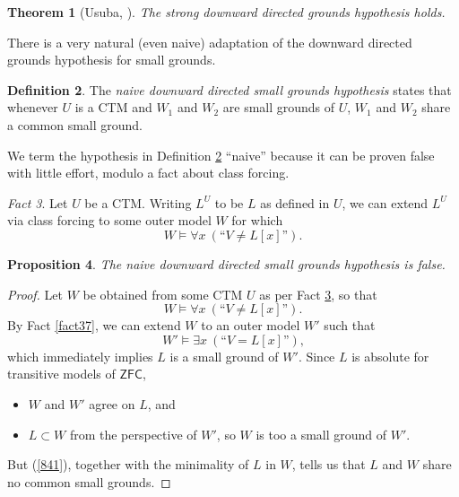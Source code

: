 \documentclass[12pt, twoside]{memoir}
\numberwithin{equation}{section}
\newtheorem{thm}{Theorem}[section]
\newtheorem{prop}[thm]{Proposition}
\theoremstyle{definition}
\newtheorem{defi}[thm]{Definition}
\theoremstyle{remark}
\newtheorem{fact}[thm]{Fact}
\theoremstyle{definition}
\theoremstyle{definition}
\theoremstyle{definition}
\theoremstyle{remark}
\begin{document}
\begin{thm}[Usuba, \cite{usuba}]
The strong downward directed grounds hypothesis holds.
\end{thm}

There is a very natural (even naive) adaptation of the downward directed grounds hypothesis for small grounds.

\begin{defi}\label{naiveddg}
The \emph{naive downward directed small grounds hypothesis} states that whenever $U$ is a CTM and $W_1$ and $W_2$ are small grounds of $U$, $W_1$ and $W_2$ share a common small ground.
\end{defi}

We term the hypothesis in Definition \ref{naiveddg} ``naive'' because it can be proven false with little effort, modulo a fact about class forcing.

\begin{fact}\label{naiveddgf}
Let $U$ be a CTM. Writing $L^U$ to be $L$ as defined in $U$, we can extend $L^U$ via class forcing to some outer model $W$ for which $$W \models \forall x \ (\text{``} V \neq L[x] \text{''}) \text{.}$$
\end{fact}

\begin{prop}\label{nddgfalse}
The naive downward directed small grounds hypothesis is false.
\end{prop}

\begin{proof}
Let $W$ be obtained from some CTM $U$ as per Fact \ref{naiveddgf}, so that 
\begin{equation}\label{841}
    W \models \forall x \ (\text{``} V \neq L[x] \text{''}) \text{.}
\end{equation} 
By Fact \ref{fact37}, we can extend $W$ to an outer model $W'$ such that $$W' \models \exists x \ (\text{``} V = L[x] \text{''}) \text{,}$$ which immediately implies $L$ is a small ground of $W'$. Since $L$ is absolute for transitive models of $\mathsf{ZFC}$, 
\begin{itemize}
    \item $W$ and $W'$ agree on $L$, and
    \item $L \subset W$ from the perspective of $W'$, so $W$ is too a small ground of $W'$.
\end{itemize} 
But (\ref{841}), together with the minimality of $L$ in $W$, tells us that $L$ and $W$ share no common small grounds.
\end{proof}
\end{document}

